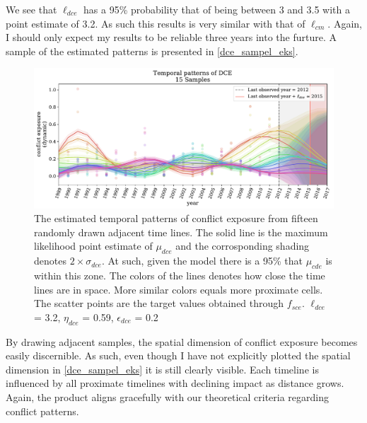 \documentclass[a4paper]{article}
\begin{document}
We see that $\ell_{dce}$ has a 95\% probability that of being between 3 and 3.5 with a point estimate of 3.2. As such this results is very similar with that of $\ell_{cm}$. Again, I should only expect my results to be reliable three years into the furture. A sample of the estimated patterns is presented in \autoref{dce_sampel_eks}.\par


\begin{figure}[!htb]
	\centering
	\includegraphics[scale=0.47]{dce_15_samples.pdf}
    \caption{\footnotesize{The estimated temporal patterns of conflict exposure from fifteen randomly drawn adjacent time lines. The solid line is the maximum likelihood point estimate of $\mu_{dce}$ and the corrosponding shading denotes $2\times\sigma_{dce}$. At such, given the model there is a 95\% that $\mu_{cde}$ is within this zone. The colors of the lines denotes how close the time lines are in space. More similar colors equals more proximate cells. The scatter points are the target values obtained through $f_{sce}$. $\ell_{dce}$ = 3.2, $\eta_{dce}$ = 0.59, $\epsilon_{dce}$ = 0.2}}\label{dce_sampel_eks}
\end{figure}

By drawing adjacent samples, the spatial dimension of conflict exposure becomes easily discernible. As such, even though I have not explicitly plotted the spatial dimension in \autoref{dce_sampel_eks} it is still clearly visible. Each timeline is influenced by all proximate timelines with declining impact as distance grows. Again, the product aligns gracefully with our theoretical criteria regarding conflict patterns.\par
\end{document}
